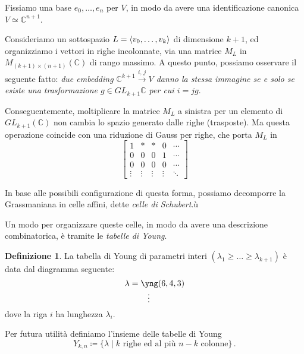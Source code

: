 \documentclass[a4paper, 11pt]{article}
\theoremstyle{definition}
\newtheorem{Def}{Definizione}[section]
\theoremstyle{plain}
\DeclarePairedDelimiter{\ang}{\langle}{\rangle}
\newcommand{\C}{\mathbb{C}}
\newcommand{\deff}{\coloneqq}
\begin{document}
Fissiamo una base $e_0, \dots, e_n$ per $V$, in modo da avere una identificazione canonica $V \simeq \C^{n+1}$.

Consideriamo un sottospazio $L = \ang{v_0, \dots, v_k}$ di dimensione $k+1$, ed organizziamo i vettori in righe incolonnate, via una matrice $M_L$ in $M_{(k+1)\times (n+1)}(\C)$ di rango massimo. A questo punto, possiamo osservare il seguente fatto: \emph{due embedding $\C^{k+1} \xrightarrow{i,\,j} V$ danno la stessa immagine se e solo se esiste una trasformazione $g \in GL_{k+1}\C$ per cui $i = jg$}.

Conseguentemente, moltiplicare la matrice $M_L$ a sinistra per un elemento di $GL_{k+1}(\C)$ non cambia lo spazio generato dalle righe (trasposte). Ma questa operazione coincide con una riduzione di Gauss per righe, che porta $M_L$ in 
\[
\begin{bmatrix}
	1 & * & * & 0 & \cdots \\
	0 & 0 & 0 & 1 & \cdots \\
	0 & 0 & 0 & 0 & \cdots\\
	\vdots & \vdots & \vdots & \vdots & \ddots 
\end{bmatrix}
\]

In base alle possibili configurazione di questa forma, possiamo decomporre la Grassmaniana in celle affini, dette \emph{celle di Schubert}.ù

Un modo per organizzare queste celle, in modo da avere una descrizione combinatorica, è tramite le \emph{tabelle di Young}.
\begin{Def}
	La tabella di Young di parametri interi $(\lambda_1 \ge \dots \ge \lambda_{k+1})$ è data dal diagramma seguente:
	\[
		\lambda = \underset{\vdots\ \ \ \ \ \ \ \ \ \ }{\yng(6,4,3)}
	\]
	dove la riga $i$ ha lunghezza $\lambda_i$.
\end{Def}
Per futura utilità definiamo l'insieme delle tabelle di Young
\[
	Y_{k,n} \deff \{\lambda \mid k \text{ righe ed al più } n - k \text{ colonne}\}\,.
\]
\end{document}
